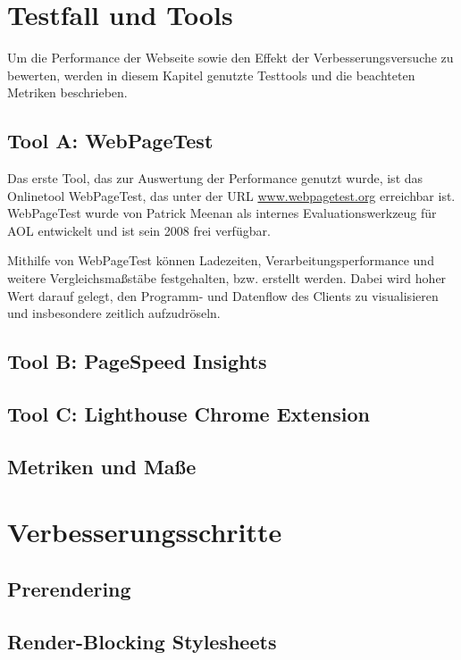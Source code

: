\documentclass[11pt,a4paper]{article}
\begin{document}
\section{Testfall und Tools}
Um die Performance der Webseite sowie den Effekt der Verbesserungsversuche zu bewerten, werden in diesem Kapitel genutzte Testtools und die beachteten Metriken beschrieben.

\subsection{Tool A: WebPageTest}
Das erste Tool, das zur Auswertung der Performance genutzt wurde, ist das Onlinetool WebPageTest, das unter der URL \href{https://www.webpagetest.org}{www.webpagetest.org} erreichbar ist.
WebPageTest wurde von Patrick Meenan als internes Evaluationswerkzeug für AOL entwickelt und ist sein 2008 frei verfügbar.

Mithilfe von WebPageTest können Ladezeiten, Verarbeitungsperformance und weitere Vergleichsmaßstäbe festgehalten, bzw. erstellt werden.
Dabei wird hoher Wert darauf gelegt, den Programm- und Datenflow des Clients zu visualisieren und insbesondere zeitlich aufzudröseln.


\subsection{Tool B: PageSpeed Insights}

\subsection{Tool C: Lighthouse Chrome Extension}

\subsection{Metriken und Maße}

\section{Verbesserungsschritte}

\subsection{Prerendering}
\subsection{Render-Blocking Stylesheets}
\end{document}
